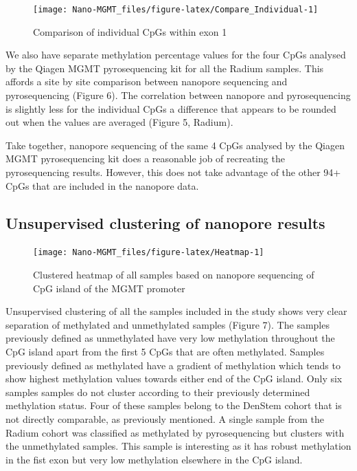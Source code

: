\documentclass[
]{article}
\begin{document}
\begin{figure}
\texttt{[image: Nano-MGMT\_files/figure-latex/Compare\_Individual-1]} \caption{Comparison of individual CpGs within exon 1}\label{fig:Compare_Individual}
\end{figure}

We also have separate methylation percentage values for the four CpGs
analysed by the Qiagen MGMT pyrosequencing kit for all the Radium
samples. This affords a site by site comparison between nanopore
sequencing and pyrosequencing (Figure 6). The correlation between
nanopore and pyrosequencing is slightly less for the individual CpGs a
difference that appears to be rounded out when the values are averaged
(Figure 5, Radium).

Take together, nanopore sequencing of the same 4 CpGs analysed by the
Qiagen MGMT pyrosequencing kit does a reasonable job of recreating the
pyrosequencing results. However, this does not take advantage of the
other 94+ CpGs that are included in the nanopore data.

\hypertarget{unsupervised-clustering-of-nanopore-results}{%
\subsection{Unsupervised clustering of nanopore
results}\label{unsupervised-clustering-of-nanopore-results}}

\begin{figure}
\texttt{[image: Nano-MGMT\_files/figure-latex/Heatmap-1]} \caption{Clustered heatmap of all samples based on nanopore sequencing of CpG island of the MGMT promoter}\label{fig:Heatmap}
\end{figure}

Unsupervised clustering of all the samples included in the study shows
very clear separation of methylated and unmethylated samples (Figure 7).
The samples previously defined as unmethylated have very low methylation
throughout the CpG island apart from the first 5 CpGs that are often
methylated. Samples previously defined as methylated have a gradient of
methylation which tends to show highest methylation values towards
either end of the CpG island. Only six samples samples do not cluster
according to their previously determined methylation status. Four of
these samples belong to the DenStem cohort that is not directly
comparable, as previously mentioned. A single sample from the Radium
cohort was classified as methylated by pyrosequencing but clusters with
the unmethylated samples. This sample is interesting as it has robust
methylation in the fist exon but very low methylation elsewhere in the
CpG island.
\end{document}
